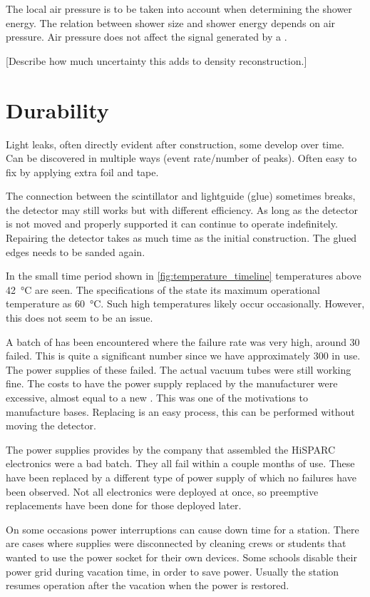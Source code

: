 The local air pressure is to be taken into account when determining the shower energy. The relation between shower size and shower energy depends on air pressure. Air pressure does not affect the signal generated by a \mip.

[Describe how much uncertainty this adds to density reconstruction.]


\section{Durability}
\label{sec:detector-durability}

Light leaks, often directly evident after construction, some develop over time. Can be discovered in multiple ways (event rate/number of peaks). Often easy to fix by applying extra foil and tape.

The connection between the scintillator and lightguide (glue) sometimes breaks, the detector may still works but with different efficiency. As long as the detector is not moved and properly supported it can continue to operate indefinitely. Repairing the detector takes as much time as the initial construction. The glued edges needs to be sanded again.

In the small time period shown in \cref{fig:temperature_timeline} temperatures above \SI{42}{\degreeCelsius} are seen. The specifications of the \pmt state its maximum operational temperature as \SI{60}{\degreeCelsius}. Such high temperatures likely occur occasionally. However, this does not seem to be an issue.

A batch of \pmts has been encountered where the failure rate was very high, around 30 \pmts failed. This is quite a significant number since we have approximately 300 \pmts in use. The power supplies of these \pmts failed. The actual vacuum tubes were still working fine. The costs to have the power supply replaced by the manufacturer were excessive, almost equal to a new \pmt. This was one of the motivations to manufacture \pmt bases. Replacing \pmts is an easy process, this can be performed without moving the detector.

The power supplies provides by the company that assembled the HiSPARC electronics were a bad batch. They all fail within a couple months of use. These have been replaced by a different type of power supply of which no failures have been observed. Not all electronics were deployed at once, so preemptive replacements have been done for those deployed later.

On some occasions power interruptions can cause down time for a station.  There are cases where supplies were disconnected by cleaning crews or students that wanted to use the power socket for their own devices. Some schools disable their power grid during vacation time, in order to save power. Usually the station resumes operation after the vacation when the power is restored.

